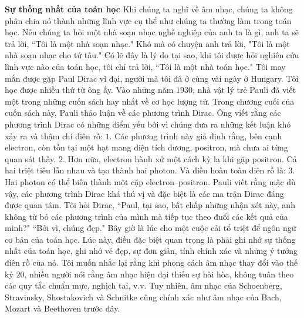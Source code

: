 \begin{multicols}{2}
	\vskip 0.05cm
	\textbf{\color{quantoan}Sự thống nhất của toán học}
	\vskip 0.05cm
	Khi chúng ta nghĩ về âm nhạc, chúng ta không phân chia nó thành những lĩnh vực cụ thể như chúng ta thường làm trong toán học. Nếu chúng ta hỏi một nhà soạn nhạc nghề nghiệp của anh ta là gì, anh ta sẽ trả lời, ``Tôi là một nhà soạn nhạc." Khó mà có chuyện anh trả lời, "Tôi là một nhà soạn nhạc cho tứ tấu." Có lẽ đây là lý do tại sao, khi tôi được hỏi nghiên cứu lĩnh vực nào của toán học, tôi chỉ trả lời, ``Tôi là một nhà toán học."
	\vskip 0.03cm
	Tôi may mắn được gặp Paul Dirac vĩ đại, người mà tôi đã ở cùng vài ngày ở Hungary. Tôi học được nhiều thứ từ ông ấy.
	\vskip 0.03cm
	Vào những năm $1930$, nhà vật lý trẻ Pauli đã viết một trong những cuốn sách hay nhất về cơ học lượng tử. Trong chương cuối của cuốn sách này, Pauli thảo luận về các phương trình Dirac. Ông viết rằng các phương trình Dirac có những điểm yếu bởi vì chúng đưa ra những kết luận khó xảy ra và thậm chí \linebreak điên rồ:
	\vskip 0.03cm
	$1.$	Các phương trình này giả định rằng, bên cạnh electron, còn tồn tại một hạt mang điện tích dương, positron, mà chưa ai từng quan sát thấy.
	\vskip 0.03cm
	$2.$	Hơn nữa, electron hành xử một cách kỳ lạ khi gặp positron. Cả hai triệt tiêu lẫn nhau và tạo thành hai photon.
	\vskip 0.03cm
	Và điều hoàn toàn điên rồ là:
	\vskip 0.03cm
	$3.$	Hai photon có thể biến thành một cặp electron--positron.
	\vskip 0.03cm
	Pauli viết rằng mặc dù vậy, các phương trình Dirac khá thú vị và đặc biệt là các ma trận Dirac đáng được quan tâm.
	\vskip 0.03cm
	Tôi hỏi Dirac, ``Paul, tại sao, bất chấp những nhận xét này, anh không từ bỏ các phương trình của mình mà tiếp tục theo đuổi các kết quả của mình?"
	\vskip 0.03cm
	``Bởi vì, chúng đẹp."
	\vskip 0.03cm
	Bây giờ là lúc cho một cuộc cải tổ triệt để ngôn ngữ cơ bản của toán học. Lúc này, điều đặc biệt quan trọng là phải ghi nhớ sự thống nhất của toán học, ghi nhớ vẻ đẹp, sự đơn giản, tính chính xác và những ý tưởng điên rồ của nó. Tôi muốn nhắc lại rằng khi phong cách âm nhạc thay đổi vào thế kỷ $20$, nhiều người nói rằng âm nhạc hiện đại thiếu sự hài hòa, không tuân theo các quy tắc chuẩn mực, nghịch tai, v.v. Tuy nhiên, âm nhạc của Schoenberg, Stravinsky, Shostakovich và Schnitke cũng chính xác như âm nhạc của Bach, Mozart và Beethoven trước đây.
\end{multicols}